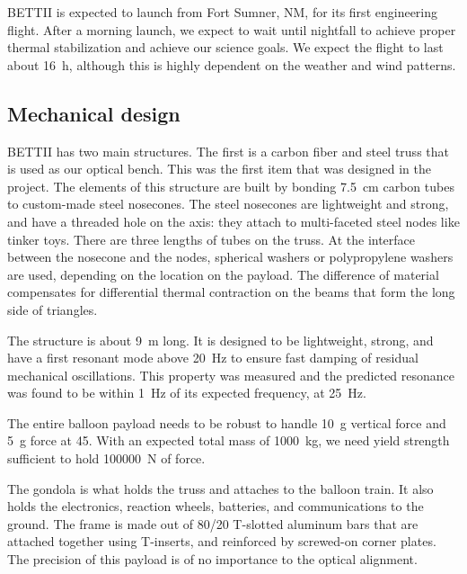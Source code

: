 BETTII is expected to launch from Fort Sumner, NM, for its first engineering flight. After a morning launch, we expect to wait until nightfall to achieve proper thermal stabilization and achieve our science goals. We expect the flight to last about \SI{16}{\hour}, although this is highly dependent on the weather and wind patterns.


\subsection{Mechanical design}

BETTII has two main structures. The first is a carbon fiber and steel truss that is used as our optical bench. This was the first item that was designed in the project. The elements of this structure are built by bonding \SI{7.5}{\centi\meter} carbon tubes to custom-made steel nosecones. The steel nosecones are lightweight and strong, and have a threaded hole on the axis: they attach to multi-faceted steel nodes like tinker toys. There are three lengths of tubes on the truss. At the interface between the nosecone and the nodes, spherical washers or polypropylene washers are used, depending on the location on the payload. The difference of material compensates for differential thermal contraction on the beams that form the long side of triangles.

The structure is about \SI{9}{\meter} long. It is designed to be lightweight, strong, and have a first resonant mode above \SI{20}{\hertz} to ensure fast damping of residual mechanical oscillations. This property was measured and the predicted resonance was found to be within \SI{1}{\hertz} of its expected frequency, at \SI{25}{\hertz}.


The entire balloon payload needs to be robust to handle 10~g vertical force and 5~g force at \SI{45}{\deg}. With an expected total mass of \SI{1000}{\kilo\gram}, we need yield strength sufficient to hold \SI{100000}{\newton} of force. 

The gondola is what holds the truss and attaches to the balloon train. It also holds the electronics, reaction wheels, batteries, and communications to the ground. The frame is made out of 80/20 T-slotted aluminum bars that are attached together using T-inserts, and reinforced by screwed-on corner plates. The precision of this payload is of no importance to the optical alignment. 

